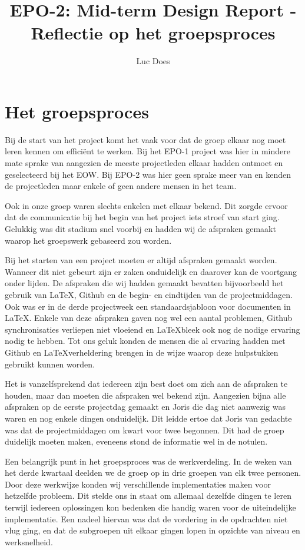 \documentclass{report}
\title{EPO-2: Mid-term Design Report - Reflectie op het groepsproces}
\author{Luc Does}
\begin{document}
\chapter{Het groepsproces}
Bij de start van het project komt het vaak voor dat de groep elkaar nog moet leren kennen om efficiënt te werken. Bij het EPO-1 project was hier in mindere mate sprake van aangezien de meeste projectleden elkaar hadden ontmoet en geselecteerd bij het EOW. Bij EPO-2 was hier geen sprake meer van en kenden de projectleden maar enkele of geen andere mensen in het team.
\newline

Ook in onze groep waren slechts enkelen met elkaar bekend. Dit zorgde ervoor dat de communicatie bij het begin van het project iets stroef van start ging. Gelukkig was dit stadium snel voorbij en hadden wij de afspraken gemaakt waarop het groepswerk gebaseerd zou worden.
\newline

Bij het starten van een project moeten er altijd afspraken gemaakt worden. Wanneer dit niet gebeurt zijn er zaken onduidelijk en daarover kan de voortgang onder lijden. De afspraken die wij hadden gemaakt bevatten bijvoorbeeld het gebruik van \LaTeX, Github en de begin- en eindtijden van de projectmiddagen. Ook was er in de derde projectweek een standaardsjabloon voor documenten in \LaTeX. Enkele van deze afspraken gaven nog wel een aantal problemen, Github synchronisaties verliepen niet vloeiend en \LaTeX bleek ook nog de nodige ervaring nodig te hebben. Tot ons geluk  konden de mensen die al ervaring hadden met Github en \LaTeX verheldering brengen in de wijze waarop deze hulpstukken gebruikt kunnen worden.
\newline

Het is  vanzelfsprekend dat iedereen zijn best doet om zich aan de afspraken te houden, maar dan moeten die afspraken wel bekend zijn. Aangezien bijna alle afspraken op de eerste projectdag gemaakt en Joris die dag niet aanwezig was waren en nog enkele dingen onduidelijk. Dit leidde ertoe dat Joris van gedachte was dat de projectmiddagen om kwart voor twee begonnen. Dit had de groep duidelijk moeten maken, eveneens stond de informatie wel in de notulen.
\newline

Een belangrijk punt in het groepsproces was de werkverdeling. In de weken van het derde kwartaal deelden we de groep op in drie groepen van elk twee personen. Door deze werkwijze konden wij verschillende implementaties maken voor hetzelfde probleem. Dit stelde ons in staat om allemaal dezelfde dingen te leren terwijl iedereen oplossingen kon bedenken die handig waren voor de uiteindelijke implementatie. Een nadeel hiervan was dat de vordering in de opdrachten niet vlug ging, en dat de subgroepen uit elkaar gingen lopen in opzichte van niveau en werksnelheid.
\end{document}
